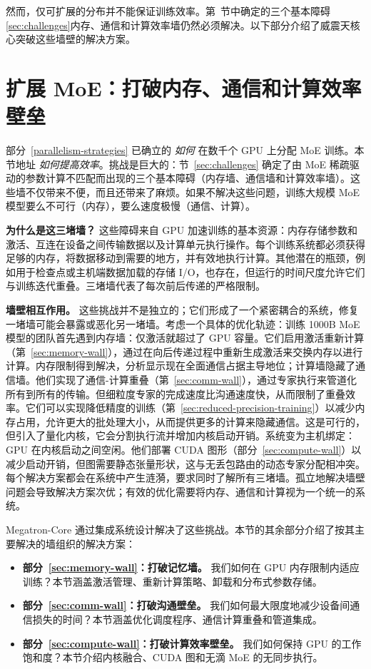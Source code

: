 然而，仅可扩展的分布并不能保证训练效率。第~节中确定的三个基本障碍\ref{sec:challenges}内存、通信和计算效率墙仍然必须解决。以下部分介绍了威震天核心突破这些墙壁的解决方案。

\section{扩展 MoE：打破内存、通信和计算效率壁垒}\label{key-features-optimizations}

部分~\ref{parallelism-strategies} 已确立的 \emph{如何} 在数千个 GPU 上分配 MoE 训练。本节地址 \emph{如何提高效率}。挑战是巨大的：节~\ref{sec:challenges} 确定了由 MoE 稀疏驱动的参数计算不匹配而出现的三个基本障碍（内存墙、通信墙和计算效率墙）。这些墙不仅带来不便，而且还带来了麻烦。如果不解决这些问题，训练大规模 MoE 模型要么不可行（内存），要么速度极慢（通信、计算）。

\textbf{为什么是这三堵墙？} 这些障碍来自 GPU 加速训练的基本资源：内存存储参数和激活、互连在设备之间传输数据以及计算单元执行操作。每个训练系统都必须获得足够的内存，将数据移动到需要的地方，并有效地执行计算。其他潜在的瓶颈，例如用于检查点或主机端数据加载的存储 I/O，也存在，但运行的时间尺度允许它们与训练迭代重叠。三堵墙代表了每次前后传递的严格限制。

\textbf{墙壁相互作用。} 这些挑战并不是独立的；它们形成了一个紧密耦合的系统，修复一堵墙可能会暴露或恶化另一堵墙。考虑一个具体的优化轨迹：训练 1000B MoE 模型的团队首先遇到内存墙：仅激活就超过了 GPU 容量。它们启用激活重新计算（第~\ref{sec:memory-wall}），通过在向后传递过程中重新生成激活来交换内存以进行计算。内存限制得到解决，分析显示现在全面通信占据主导地位；计算墙隐藏了通信墙。他们实现了通信-计算重叠（第~\ref{sec:comm-wall}），通过专家执行来管道化所有到所有的传输。但细粒度专家的完成速度比沟通速度快，从而限制了重叠效率。它们可以实现降低精度的训练（第~\ref{sec:reduced-precision-training}）以减少内存占用，允许更大的批处理大小，从而提供更多的计算来隐藏通信。这是可行的，但引入了量化内核，它会分割执行流并增加内核启动开销。系统变为主机绑定：GPU 在内核启动之间空闲。他们部署 CUDA 图形（部分~\ref{sec:compute-wall}）以减少启动开销，但图需要静态张量形状，这与无丢包路由的动态专家分配相冲突。每个解决方案都会在系统中产生涟漪，要求同时了解所有三堵墙。孤立地解决墙壁问题会导致解决方案次优；有效的优化需要将内存、通信和计算视为一个统一的系统。

Megatron-Core 通过集成系统设计解决了这些挑战。本节的其余部分介绍了按其主要解决的墙组织的解决方案：
\begin{itemize}
    \item \textbf{部分~\ref{sec:memory-wall}：打破记忆墙。} 我们如何在 GPU 内存限制内适应训练？本节涵盖激活管理、重新计算策略、卸载和分布式参数存储。
    \item \textbf{部分~\ref{sec:comm-wall}：打破沟通壁垒。} 我们如何最大限度地减少设备间通信损失的时间？本节涵盖优化调度程序、通信计算重叠和管道集成。
    \item \textbf{部分~\ref{sec:compute-wall}：打破计算效率壁垒。} 我们如何保持 GPU 的工作饱和度？本节介绍内核融合、CUDA 图和无滴 MoE 的无同步执行。
\end{itemize}

